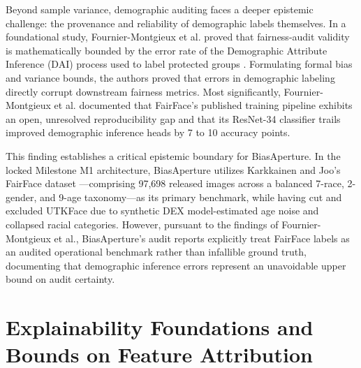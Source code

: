 Beyond sample variance, demographic auditing faces a deeper epistemic challenge: the provenance and reliability of demographic labels themselves. In a foundational study, Fournier-Montgieux et al. proved that fairness-audit validity is mathematically bounded by the error rate of the Demographic Attribute Inference (DAI) process used to label protected groups \cite{fourniermontgieux2025reliable}. Formulating formal bias and variance bounds, the authors proved that errors in demographic labeling directly corrupt downstream fairness metrics. Most significantly, Fournier-Montgieux et al. documented that FairFace's published training pipeline exhibits an open, unresolved reproducibility gap and that its ResNet-34 classifier trails improved demographic inference heads by 7 to 10 accuracy points.

This finding establishes a critical epistemic boundary for BiasAperture. In the locked Milestone M1 architecture, BiasAperture utilizes Karkkainen and Joo's FairFace dataset \cite{karkkainen2021fairface}---comprising 97,698 released images across a balanced 7-race, 2-gender, and 9-age taxonomy---as its primary benchmark, while having cut and excluded UTKFace due to synthetic DEX model-estimated age noise and collapsed racial categories. However, pursuant to the findings of Fournier-Montgieux et al., BiasAperture's audit reports explicitly treat FairFace labels as an audited operational benchmark rather than infallible ground truth, documenting that demographic inference errors represent an unavoidable upper bound on audit certainty.


\section{Explainability Foundations and Bounds on Feature Attribution}
\label{sec:lit_xai}


